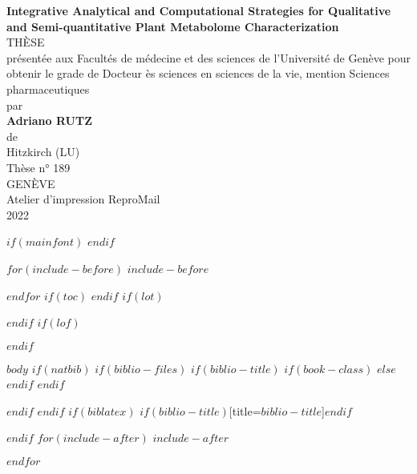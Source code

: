 \documentclass[$if(fontsize)$$fontsize$,$endif$$if(lang)$$lang$,$endif$$if(papersize)$$papersize$,$endif$$for(classoption)$$classoption$$sep$,$endfor$]{$documentclass$}
\begin{document}
\setmainfont{Arial}
\pagestyle{fancy}
\thispagestyle{firstpage}
\begin{center}
\singlespacing
\vspace*{2.0cm}
\Large
\textbf{Integrative Analytical and Computational Strategies for Qualitative and Semi-quantitative Plant Metabolome Characterization}\\
\vspace{3.0cm}
{THÈSE}\\
\vspace{0.25cm}
\large
{présentée aux Facultés de médecine et des sciences de l'Université de Genève pour obtenir le grade de Docteur ès sciences en sciences de la vie, mention Sciences pharmaceutiques}\\
\vspace{1.5cm}
{par}\\
\vspace{0.25cm}
\textbf{Adriano RUTZ}\\
\vspace{0.25cm}
{de}\\
\vspace{0.25cm}
{Hitzkirch (LU)}\\
\vspace{1.5cm}
{Thèse n° 189}\\
\vspace{3.0cm}
{GENÈVE}\\
\vspace{0.25cm}
{Atelier d’impression ReproMail}\\
\vspace{0.25cm}
{2022}
\end{center}
$if(mainfont)$
    \setmainfont{$mainfont$}
$endif$

$for(include-before)$
$include-before$

$endfor$
$if(toc)$
{
\setcounter{tocdepth}{$toc-depth$}
\tableofcontents
}
$endif$
$if(lot)$
\listoftables
$endif$
$if(lof)$
\listoffigures
$endif$

$body$
$if(natbib)$
$if(biblio-files)$
$if(biblio-title)$
$if(book-class)$
\renewcommand\bibname{$biblio-title$}
$else$
\renewcommand\refname{$biblio-title$}
$endif$
$endif$


$endif$
$endif$
$if(biblatex)$
\printbibliography$if(biblio-title)$[title=$biblio-title$]$endif$

$endif$
$for(include-after)$
$include-after$

$endfor$
\end{document}
